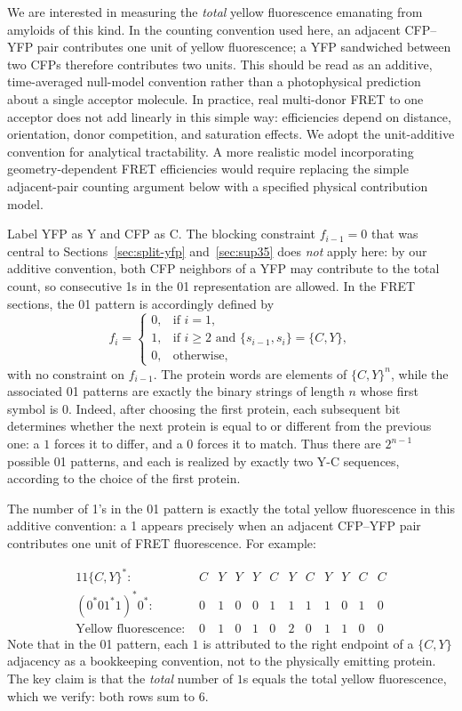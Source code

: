 \documentclass[11pt]{article}
\begin{document}
We are interested in measuring the \textit{total} yellow fluorescence emanating from amyloids of this kind. In the counting convention used here, an adjacent CFP--YFP pair contributes one unit of yellow fluorescence; a YFP sandwiched between two CFPs therefore contributes two units. This should be read as an additive, time-averaged null-model convention rather than a photophysical prediction about a single acceptor molecule. In practice, real multi-donor FRET to one acceptor does not add linearly in this simple way: efficiencies depend on distance, orientation, donor competition, and saturation effects. We adopt the unit-additive convention for analytical tractability. A more realistic model incorporating geometry-dependent FRET efficiencies would require replacing the simple adjacent-pair counting argument below with a specified physical contribution model.

Label YFP as Y and CFP as C. The blocking constraint $f_{i-1} = 0$ that was central to Sections~\ref{sec:split-yfp} and~\ref{sec:sup35} does \emph{not} apply here: by our additive convention, both CFP neighbors of a YFP may contribute to the total count, so consecutive 1s in the 01 representation are allowed. In the FRET sections, the 01 pattern is accordingly defined by
\[
f_i = \begin{cases}
0, & \text{if } i = 1, \\
1, & \text{if } i \ge 2 \text{ and } \{s_{i-1}, s_i\} = \{C, Y\}, \\
0, & \text{otherwise,}
\end{cases}
\]
with no constraint on $f_{i-1}$. The protein words are elements of $\{C,Y\}^n$, while the associated 01 patterns are exactly the binary strings of length $n$ whose first symbol is $0$. Indeed, after choosing the first protein, each subsequent bit determines whether the next protein is equal to or different from the previous one: a $1$ forces it to differ, and a $0$ forces it to match. Thus there are $2^{n-1}$ possible 01 patterns, and each is realized by exactly two Y-C sequences, according to the choice of the first protein.

The number of 1's in the 01 pattern is exactly the total yellow fluorescence in this additive convention: a 1 appears precisely when an adjacent CFP--YFP pair contributes one unit of FRET fluorescence. For example:

\begin{alignat*}{11}
\text{$\{C, Y \}^*$:  } & C & Y & Y & Y & C & Y & C & Y & Y & C  & C \\
\text{$(0^*0 1^* 1)^* 0^*$:  } & 0 & 1 & 0 & 0 & 1 & 1 & 1 & 1 & 0 & 1 & 0 \\
\text{Yellow fluorescence:  } & 0 & 1 & 0 & 1 & 0 & 2 & 0 & 1 & 1 & 0 & 0
\end{alignat*}
Note that in the 01 pattern, each $1$ is attributed to the right endpoint of a $\{C,Y\}$ adjacency as a bookkeeping convention, not to the physically emitting protein. The key claim is that the \textit{total} number of $1$s equals the total yellow fluorescence, which we verify: both rows sum to $6$.
\end{document}
